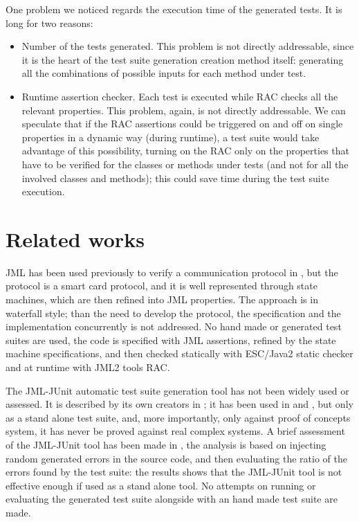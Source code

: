 \documentclass{article} \usepackage{times}
\begin{document}
One problem we noticed regards the execution time of the generated
tests.  It is long for two reasons:

\begin{itemize}
\item Number of the tests generated. This problem is not directly
  addressable, since it is the heart of the test suite generation
  creation method itself: generating all the combinations of possible
  inputs for each method under test.
\item Runtime assertion checker. Each test is executed while RAC
  checks all the relevant properties. This problem, again, is not
  directly addressable. We can speculate that if the RAC assertions
  could be triggered on and off on single properties in a dynamic way
  (during runtime), a test suite would take advantage of this
  possibility, turning on the RAC only on the properties that have to
  be verified for the classes or methods under tests (and not for all
  the involved classes and methods); this could save time during the
  test suite execution.
\end{itemize}



\section{Related works}
\label{sec:related_works}

JML has been used previously to verify a communication protocol in
\cite{Hubbers2004}, but the protocol is a smart card protocol, and it
is well represented through state machines, which are then refined
into JML properties.  The approach is in waterfall style; than the
need to develop the protocol, the specification and the implementation
concurrently is not addressed.  No hand made or generated test suites
are used, the code is specified with JML assertions, refined by the
state machine specifications, and then checked statically with
ESC/Java2 static checker\cite{CokKiniry04} and at runtime with JML2
tools RAC\cite{BurdyEtal05-STTT}.

The JML-JUnit automatic test suite generation tool has not been widely
used or assessed. It is described by its own creators in
\cite{Cheon2002,Cheon2004,Cheon2005}; it has been used in
\cite{Oriat2004} and \cite{Cheon2005}, but only as a stand alone test
suite, and, more importantly, only against proof of concepts system,
it has never be proved against real complex systems.  A brief
assessment of the JML-JUnit tool has been made in \cite{Tan2004}, the
analysis is based on injecting random generated errors in the source
code, and then evaluating the ratio of the errors found by the test
suite: the results shows that the JML-JUnit tool is not effective
enough if used as a stand alone tool. No attempts on running or
evaluating the generated test suite alongside with an hand made test
suite are made.
\end{document}

